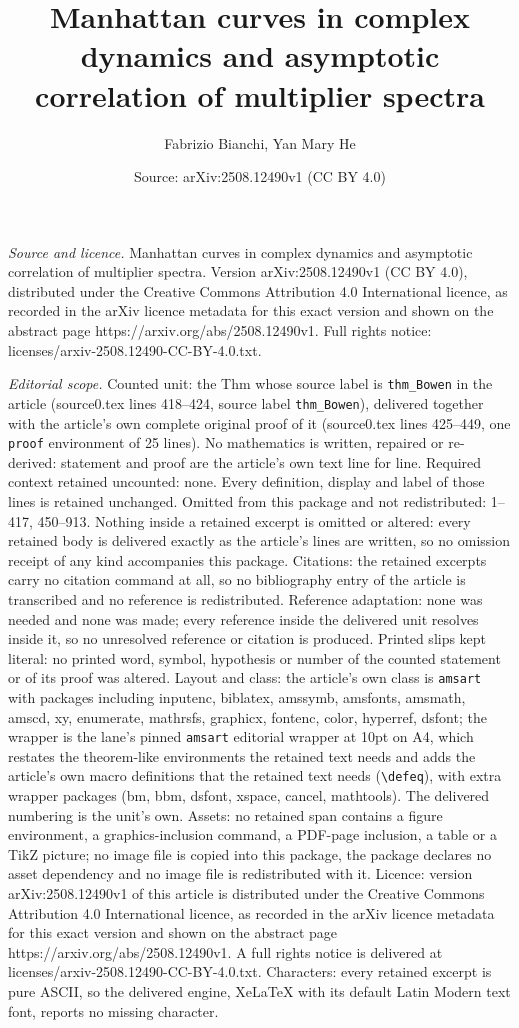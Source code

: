 \documentclass[10pt,a4paper]{amsart}
\title[Manhattan curves in complex dynamics and asymptotic correlat]{Manhattan curves in complex dynamics and asymptotic correlation of multiplier spectra}
\author{Fabrizio Bianchi, Yan Mary He}
\date{Source: arXiv:2508.12490v1 (CC BY 4.0)}
\begin{document}
\maketitle

\noindent\emph{Source and licence.} Manhattan curves in complex dynamics and asymptotic correlation of multiplier spectra. Version arXiv:2508.12490v1 (CC BY 4.0), distributed under the Creative Commons Attribution 4.0 International licence, as recorded in the arXiv licence metadata for this exact version and shown on the abstract page https://arxiv.org/abs/2508.12490v1. Full rights notice: licenses/arxiv-2508.12490-CC-BY-4.0.txt.\par\smallskip

\noindent\textit{Editorial scope.} Counted unit: the Thm whose source label is \texttt{thm\_Bowen} in the article (source0.tex lines 418--424, source label \texttt{thm\_Bowen}), delivered together with the article's own complete original proof of it (source0.tex lines 425--449, one \texttt{proof} environment of 25 lines). No mathematics is written, repaired or re-derived: statement and proof are the article's own text line for line. Required context retained uncounted: none. Every definition, display and label of those lines is retained unchanged. Omitted from this package and not redistributed: 1--417, 450--913. Nothing inside a retained excerpt is omitted or altered: every retained body is delivered exactly as the article's lines are written, so no omission receipt of any kind accompanies this package. Citations: the retained excerpts carry no citation command at all, so no bibliography entry of the article is transcribed and no reference is redistributed. Reference adaptation: none was needed and none was made; every reference inside the delivered unit resolves inside it, so no unresolved reference or citation is produced. Printed slips kept literal: no printed word, symbol, hypothesis or number of the counted statement or of its proof was altered. Layout and class: the article's own class is \texttt{amsart} with packages including inputenc, biblatex, amssymb, amsfonts, amsmath, amscd, xy, enumerate, mathrsfs, graphicx, fontenc, color, hyperref, dsfont; the wrapper is the lane's pinned \texttt{amsart} editorial wrapper at 10pt on A4, which restates the theorem-like environments the retained text needs and adds the article's own macro definitions that the retained text needs (\texttt{\textbackslash defeq}), with extra wrapper packages (bm, bbm, dsfont, xspace, cancel, mathtools). The delivered numbering is the unit's own. Assets: no retained span contains a figure environment, a graphics-inclusion command, a PDF-page inclusion, a table or a TikZ picture; no image file is copied into this package, the package declares no asset dependency and no image file is redistributed with it. Licence: version arXiv:2508.12490v1 of this article is distributed under the Creative Commons Attribution 4.0 International licence, as recorded in the arXiv licence metadata for this exact version and shown on the abstract page https://arxiv.org/abs/2508.12490v1. A full rights notice is delivered at licenses/arxiv-2508.12490-CC-BY-4.0.txt. Characters: every retained excerpt is pure ASCII, so the delivered engine, XeLaTeX with its default Latin Modern text font, reports no missing character.
\end{document}
